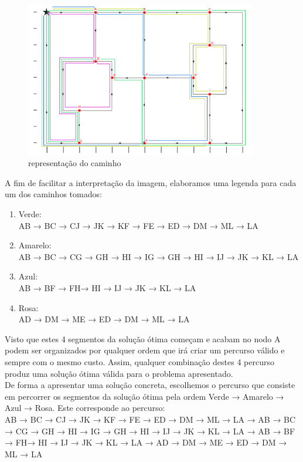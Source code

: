 \documentclass[a4paper]{report}
\begin{document}
\begin{figure}[H]
    \begin{center}
        \includegraphics[width=0.9\textwidth]{images/desafioSolucao.png}\par
        \caption{representação do caminho}
        \label{fig:path}
    \end{center}
\end{figure}
A fim de facilitar a interpretação da imagem, elaboramos uma legenda para cada
um dos caminhos tomados:

\begin{enumerate}
    \item Verde: \\
    AB → BC → CJ → JK → KF → FE → ED → DM → ML → LA
    \item Amarelo: \\
    AB → BC → CG → GH → HI  → IG → GH → HI → IJ → JK  → KL  → LA
    \item Azul: \\
    AB → BF → FH→ HI  → IJ → JK  → KL  → LA
    \item Rosa: \\
    AD → DM → ME → ED  → DM → ML → LA
\end{enumerate}
Visto que estes 4 segmentos da solução ótima começam e acabam no nodo A podem
ser organizados por qualquer ordem que irá criar um percurso válido e sempre com
o mesmo custo. Assim, qualquer combinação destes 4 percurso produz uma solução
ótima válida para o problema apresentado.\\
De forma a apresentar uma solução concreta, escolhemos o percurso que consiste
em percorrer os segmentos da solução ótima pela ordem Verde → Amarelo → Azul →
Rosa. Este corresponde ao percurso:\\
AB → BC → CJ → JK → KF → FE → ED → DM → ML → LA →
AB → BC → CG → GH → HI  → IG → GH → HI → IJ → JK  → KL  → LA →
AB → BF → FH→ HI  → IJ → JK  → KL  → LA →
AD → DM → ME → ED  → DM → ML → LA
\end{document}
